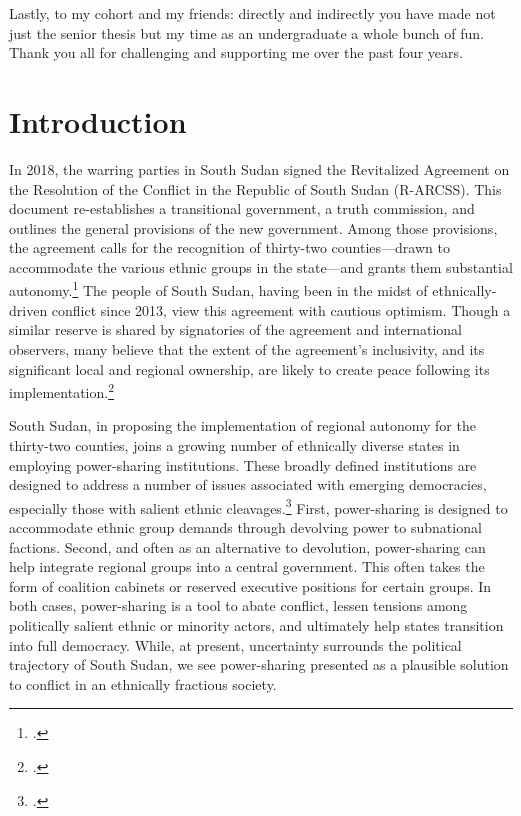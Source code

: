 \documentclass[12pt]{article}
\begin{document}
Lastly, to my cohort and my friends: directly and indirectly you have made not just the senior thesis but my time as an undergraduate a whole bunch of fun. Thank you all for challenging and supporting me over the past four years.

\pagebreak


\doublespacing

\section{Introduction}
In 2018, the warring parties in South Sudan signed the Revitalized Agreement on the Resolution of the Conflict in the Republic of South Sudan (R-ARCSS). This document re-establishes a transitional government, a truth commission, and outlines the general provisions of the new government. Among those provisions, the agreement calls for the recognition of thirty-two counties---drawn to accommodate the various ethnic groups in the state---and grants them substantial autonomy.\footcite{intergovernmental_authority_on_development_agreement_2015, vhumbunu_reviving_2019} The people of South Sudan, having been in the midst of ethnically-driven conflict since 2013, view this agreement with cautious optimism. Though a similar reserve is shared by signatories of the agreement and international observers, many believe that the extent of the agreement's inclusivity, and its significant local and regional ownership, are likely to create peace following its implementation.\footcite{vhumbunu_reviving_2019, njoroge_status_2019} 

South Sudan, in proposing the implementation of regional autonomy for the thirty-two counties, joins a growing number of ethnically diverse states in employing power-sharing institutions. These broadly defined institutions are designed to address a number of issues associated with emerging democracies, especially those with salient ethnic cleavages.\footcite{horowitz_ethnic_1985, lijphart_consociational_1969, esman_management_1973, nordlinger_conflict_1972} First, power-sharing is designed to accommodate ethnic group demands through devolving power to subnational factions. Second, and often as an alternative to devolution, power-sharing can help integrate regional groups into a central government. This often takes the form of coalition cabinets or reserved executive positions for certain groups. In both cases, power-sharing is a tool to abate conflict, lessen tensions among politically salient ethnic or minority actors, and ultimately help states transition into full democracy. While, at present, uncertainty surrounds the political trajectory of South Sudan, we see power-sharing presented as a plausible solution to conflict in an ethnically fractious society. 
\end{document}
